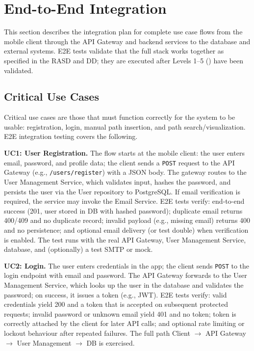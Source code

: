 \section{End-to-End Integration}
\label{sec:end_to_end_integration}%

This section describes the integration plan for complete use case flows from the mobile client through the API Gateway and backend services to the database and external systems. E2E tests validate that the full stack works together as specified in the RASD and DD; they are executed after Levels 1--5 () have been validated.

\subsection{Critical Use Cases}
\label{subsec:critical_use_cases}%

Critical use cases are those that must function correctly for the system to be usable: registration, login, manual path insertion, and path search/visualization. E2E integration testing covers the following.

\textbf{UC1: User Registration.}
The flow starts at the mobile client: the user enters email, password, and profile data; the client sends a \texttt{POST} request to the API Gateway (e.g., \texttt{/users/register}) with a JSON body. The gateway routes to the User Management Service, which validates input, hashes the password, and persists the user via the User repository to PostgreSQL. If email verification is required, the service may invoke the Email Service. E2E tests verify: end-to-end success (201, user stored in DB with hashed password); duplicate email returns 400/409 and no duplicate record; invalid payload (e.g., missing email) returns 400 and no persistence; and optional email delivery (or test double) when verification is enabled. The test runs with the real API Gateway, User Management Service, database, and (optionally) a test SMTP or mock.

\textbf{UC2: Login.}
The user enters credentials in the app; the client sends \texttt{POST} to the login endpoint with email and password. The API Gateway forwards to the User Management Service, which looks up the user in the database and validates the password; on success, it issues a token (e.g., JWT). E2E tests verify: valid credentials yield 200 and a token that is accepted on subsequent protected requests; invalid password or unknown email yield 401 and no token; token is correctly attached by the client for later API calls; and optional rate limiting or lockout behaviour after repeated failures. The full path Client $\to$ API Gateway $\to$ User Management $\to$ DB is exercised.

